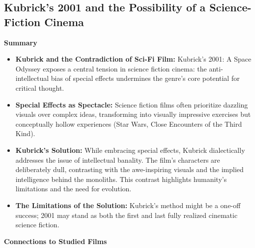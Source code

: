\documentclass[11pt,fleqn]{book}
\begin{document}
\subsection{Kubrick's 2001 and the Possibility of a Science-Fiction Cinema}

\textbf{Summary}

\begin{itemize}
\item \textbf{Kubrick and the Contradiction of Sci-Fi Film:}  Kubrick's 2001: A Space Odyssey exposes a central tension in science fiction cinema: the anti-intellectual bias of special effects undermines the genre's core potential for critical thought. 

\item \textbf{Special Effects as Spectacle:} Science fiction films often prioritize dazzling visuals over complex ideas, transforming into visually impressive exercises but conceptually hollow experiences (Star Wars, Close Encounters of the Third Kind).

\item \textbf{Kubrick's Solution:} While embracing special effects, Kubrick dialectically addresses the issue of intellectual banality. The film's characters are deliberately  dull, contrasting with the awe-inspiring visuals and the implied intelligence behind the monoliths. This contrast highlights  humanity's limitations and the need for evolution.

\item \textbf{The Limitations of the Solution:} Kubrick's method might be a one-off success;  2001  may stand as both the first and last fully realized cinematic science fiction. 
\end{itemize}
\vspace{5pt}
\textbf{Connections to Studied Films}
\end{document}
